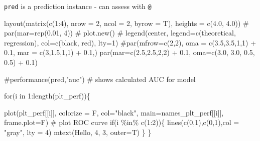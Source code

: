 \documentclass[
  letterpaper,
  DIV=11,
  numbers=noendperiod]{scrartcl}
\newenvironment{Shaded}{\begin{snugshade}}{\end{snugshade}}
\newcommand{\AttributeTok}[1]{\textcolor[rgb]{0.40,0.45,0.13}{#1}}
\newcommand{\CommentTok}[1]{\textcolor[rgb]{0.37,0.37,0.37}{#1}}
\newcommand{\ControlFlowTok}[1]{\textcolor[rgb]{0.00,0.23,0.31}{#1}}
\newcommand{\DecValTok}[1]{\textcolor[rgb]{0.68,0.00,0.00}{#1}}
\newcommand{\FloatTok}[1]{\textcolor[rgb]{0.68,0.00,0.00}{#1}}
\newcommand{\FunctionTok}[1]{\textcolor[rgb]{0.28,0.35,0.67}{#1}}
\newcommand{\NormalTok}[1]{\textcolor[rgb]{0.00,0.23,0.31}{#1}}
\newcommand{\SpecialCharTok}[1]{\textcolor[rgb]{0.37,0.37,0.37}{#1}}
\newcommand{\StringTok}[1]{\textcolor[rgb]{0.13,0.47,0.30}{#1}}
\begin{document}
\texttt{pred} is a prediction instance - can assess with \texttt{@}

\begin{Shaded}
\begin{Highlighting}[]
\FunctionTok{layout}\NormalTok{(}\FunctionTok{matrix}\NormalTok{(}\FunctionTok{c}\NormalTok{(}\DecValTok{1}\SpecialCharTok{:}\DecValTok{4}\NormalTok{), }\AttributeTok{nrow =} \DecValTok{2}\NormalTok{, }\AttributeTok{ncol =} \DecValTok{2}\NormalTok{, }\AttributeTok{byrow =}\NormalTok{ T), }\AttributeTok{heights =} \FunctionTok{c}\NormalTok{(}\FloatTok{4.0}\NormalTok{, }\FloatTok{4.0}\NormalTok{))}
\CommentTok{\# par(mar=rep(0.01, 4))}
\CommentTok{\# plot.new()}
\CommentTok{\# legend(\textquotesingle{}center\textquotesingle{}, legend=c(\textquotesingle{}theoretical\textquotesingle{}, \textquotesingle{}regression\textquotesingle{}), col=c(\textquotesingle{}black\textquotesingle{}, \textquotesingle{}red\textquotesingle{}), lty=1)}
\CommentTok{\#par(mfrow=c(2,2), oma = c(3.5,3.5,1,1) + 0.1, mar = c(3,1.5,1,1) + 0.1,)}
\FunctionTok{par}\NormalTok{(}\AttributeTok{mar=}\FunctionTok{c}\NormalTok{(}\FloatTok{2.5}\NormalTok{,}\FloatTok{2.5}\NormalTok{,}\DecValTok{2}\NormalTok{,}\DecValTok{2}\NormalTok{) }\SpecialCharTok{+} \FloatTok{0.1}\NormalTok{, }\AttributeTok{oma=}\FunctionTok{c}\NormalTok{(}\FloatTok{3.0}\NormalTok{, }\FloatTok{3.0}\NormalTok{, }\FloatTok{0.5}\NormalTok{, }\FloatTok{0.5}\NormalTok{) }\SpecialCharTok{+} \FloatTok{0.1}\NormalTok{)}

\CommentTok{\#performance(pred,"auc") \# shows calculated AUC for model}

\ControlFlowTok{for}\NormalTok{(i }\ControlFlowTok{in} \DecValTok{1}\SpecialCharTok{:}\FunctionTok{length}\NormalTok{(plt\_perf))\{}

    \FunctionTok{plot}\NormalTok{(plt\_perf[[i]], }\AttributeTok{colorize =}\NormalTok{ F, }\AttributeTok{col=}\StringTok{"black"}\NormalTok{, }\AttributeTok{main=}\NormalTok{names\_plt\_perf[[i]], }\AttributeTok{frame.plot=}\NormalTok{F) }\CommentTok{\# plot ROC curve}
    \ControlFlowTok{if}\NormalTok{(i }\SpecialCharTok{\%in\%} \FunctionTok{c}\NormalTok{(}\DecValTok{1}\SpecialCharTok{:}\DecValTok{2}\NormalTok{))\{}
        \FunctionTok{lines}\NormalTok{(}\FunctionTok{c}\NormalTok{(}\DecValTok{0}\NormalTok{,}\DecValTok{1}\NormalTok{),}\FunctionTok{c}\NormalTok{(}\DecValTok{0}\NormalTok{,}\DecValTok{1}\NormalTok{),}\AttributeTok{col =} \StringTok{"gray"}\NormalTok{, }\AttributeTok{lty =} \DecValTok{4}\NormalTok{)}
        \FunctionTok{mtext}\NormalTok{(}\StringTok{\textquotesingle{}Hello\textquotesingle{}}\NormalTok{, }\DecValTok{4}\NormalTok{, }\DecValTok{3}\NormalTok{, }\AttributeTok{outer=}\NormalTok{T) }
\NormalTok{    \}}
\NormalTok{\}}
\end{Highlighting}
\end{Shaded}
\end{document}
